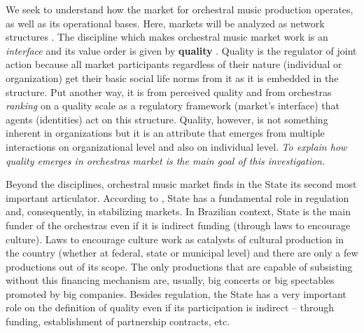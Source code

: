 \documentclass[a4paper, 12pt, openright, oneside, german, french, brazil, english]{abntex2}
\begin{document}
	We seek to understand how the market for orchestral music production operates, as well as its operational bases. Here, markets will be analyzed as network structures \cite{white2002markets}. The discipline which makes orchestral music market work is an \textit{interface} and its value order is given by \textbf{quality} \cite{white2002markets}. Quality is the regulator of joint action because all market participants regardless of their nature (individual or organization) get their basic social life norms from it as it is embedded in the structure. Put another way, it is from perceived quality and from orchestras \textit{ranking} on a quality scale as a regulatory framework (market's interface) that agents (identities) act on this structure. Quality, however, is not something inherent in organizations but it is an attribute that emerges from multiple interactions on organizational level and also on individual level. \textit{To explain how quality emerges in orchestras market is the main goal of this investigation.}
	
	
	Beyond the disciplines, orchestral music market finds in the State its second most important articulator. According to , State has a fundamental role in regulation and, consequently, in stabilizing markets. In Brazilian context, State is the main funder of the orchestras even if it is indirect funding (through laws to encourage culture). Laws to encourage culture work as catalysts of cultural production in the country (whether at federal, state or municipal level) and there are only a few productions out of its scope. The only productions that are capable of subsisting without this financing mechanism are, usually, big concerts or big spectables promoted by big companies. Besides regulation, the State has a very important role on the definition of quality even if its participation is indirect -- through funding, establishment of partnership contracts, etc.
	
\end{document}
